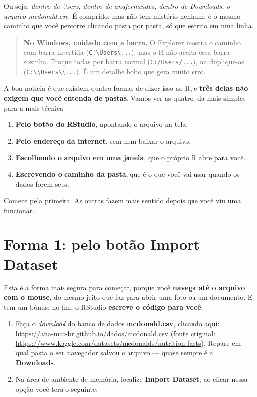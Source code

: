 \documentclass[
]{book}
\providecommand{\tightlist}{%
  \setlength{\itemsep}{0pt}\setlength{\parskip}{0pt}}
\begin{document}
Ou seja: \emph{dentro de Users, dentro de anafernandes, dentro de Downloads, o arquivo mcdonald.csv}. É comprido, mas não tem mistério nenhum: é o mesmo caminho que você percorre clicando pasta por pasta, só que escrito em uma linha.

\begin{quote}
\textbf{No Windows, cuidado com a barra.} O Explorer mostra o caminho com barra invertida (\texttt{C:\textbackslash{}Users\textbackslash{}...}), mas o R não aceita essa barra sozinha. Troque todas por barra normal (\texttt{C:/Users/...}), ou duplique-as (\texttt{C:\textbackslash{}\textbackslash{}Users\textbackslash{}\textbackslash{}...}). É um detalhe bobo que gera muito erro.
\end{quote}

A boa notícia é que existem quatro formas de dizer isso ao R, e \textbf{três delas não exigem que você entenda de pastas}. Vamos ver as quatro, da mais simples para a mais técnica:

\begin{enumerate}
\def\labelenumi{\arabic{enumi}.}
\tightlist
\item
  \textbf{Pelo botão do RStudio}, apontando o arquivo na tela.
\item
  \textbf{Pelo endereço da internet}, sem nem baixar o arquivo.
\item
  \textbf{Escolhendo o arquivo em uma janela}, que o próprio R abre para você.
\item
  \textbf{Escrevendo o caminho da pasta}, que é o que você vai usar quando os dados forem seus.
\end{enumerate}

Comece pela primeira. As outras fazem mais sentido depois que você viu uma funcionar.

\section{Forma 1: pelo botão Import Dataset}\label{forma-1-pelo-botuxe3o-import-dataset}

Esta é a forma mais segura para começar, porque você \textbf{navega até o arquivo com o mouse}, do mesmo jeito que faz para abrir uma foto ou um documento. E tem um bônus: no fim, o RStudio \textbf{escreve o código para você}.

\begin{enumerate}
\def\labelenumi{\arabic{enumi}.}
\item
  Faça o \emph{download} do banco de dados \textbf{mcdonald.csv}, clicando aqui: \url{https://ana-mat-br.github.io/dados/mcdonald.csv}
  (fonte original: \url{https://www.kaggle.com/datasets/mcdonalds/nutrition-facts}). Repare em qual pasta o seu navegador salvou o arquivo --- quase sempre é a \textbf{Downloads}.
\item
  Na área de ambiente de memória, localize \textbf{Import Dataset}, ao clicar nessa opção você terá o seguinte:
\end{enumerate}
\end{document}
